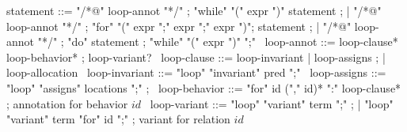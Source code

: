 \begin{syntax}
  statement ::= "/*@" loop-annot "*/" ;
  "while" "(" expr ")" statement ;
  | "/*@" loop-annot "*/" ;
  "for" "(" expr ";" expr ";" expr ")";
  statement ;
  | "/*@" loop-annot "*/" ;
  "do" statement ;
  "while" "(" expr ")" ";"
  \
  loop-annot ::= loop-clause* loop-behavior* ;
                 loop-variant?
  \
  loop-clause ::= loop-invariant | loop-assigns ;
                | loop-allocation
  \
  loop-invariant ::= "loop" "invariant" pred ";" 
  \
  loop-assigns ::= "loop" 
                   "assigns" locations ";" ;
  \
  loop-behavior ::= "for" id ("," id)* ":" loop-clause* ; annotation for behavior $id$
  \
  loop-variant ::= "loop" "variant" term ";" ;
  | "loop" "variant" term "for" id ";" ; variant for relation $id$
\end{syntax}
